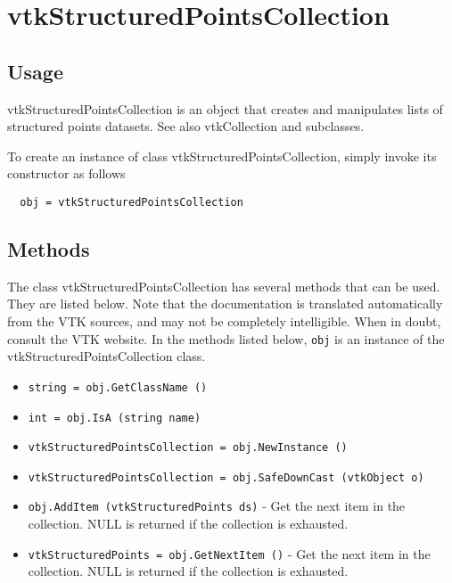 \section{vtkStructuredPointsCollection}

\subsection{Usage}

 vtkStructuredPointsCollection is an object that creates and manipulates
 lists of structured points datasets. See also vtkCollection and
 subclasses.

To create an instance of class vtkStructuredPointsCollection, simply
invoke its constructor as follows
\begin{verbatim}
  obj = vtkStructuredPointsCollection
\end{verbatim}
\subsection{Methods}

The class vtkStructuredPointsCollection has several methods that can be used.
  They are listed below.
Note that the documentation is translated automatically from the VTK sources,
and may not be completely intelligible.  When in doubt, consult the VTK website.
In the methods listed below, \verb|obj| is an instance of the vtkStructuredPointsCollection class.
\begin{itemize}
\item  \verb|string = obj.GetClassName ()|

\item  \verb|int = obj.IsA (string name)|

\item  \verb|vtkStructuredPointsCollection = obj.NewInstance ()|

\item  \verb|vtkStructuredPointsCollection = obj.SafeDownCast (vtkObject o)|

\item  \verb|obj.AddItem (vtkStructuredPoints ds)| -  Get the next item in the collection. NULL is returned if the collection
 is exhausted.

\item  \verb|vtkStructuredPoints = obj.GetNextItem ()| -  Get the next item in the collection. NULL is returned if the collection
 is exhausted.

\end{itemize}
